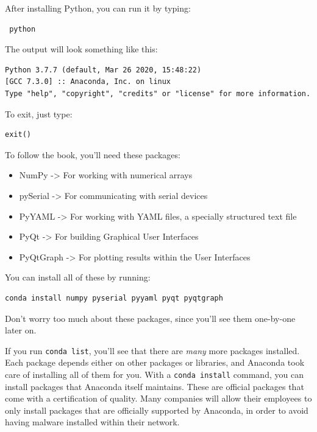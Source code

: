 
After installing Python, you can run it by typing:

\begin{verbatim}
 python
\end{verbatim}

The output will look something like this:

\begin{verbatim}
Python 3.7.7 (default, Mar 26 2020, 15:48:22)
[GCC 7.3.0] :: Anaconda, Inc. on linux
Type "help", "copyright", "credits" or "license" for more information.
\end{verbatim}

To exit, just type:

\begin{verbatim}
exit()
\end{verbatim}

To follow the book, you'll need these packages:

\begin{itemize}
 \item NumPy -> For working with numerical arrays
 \item pySerial -> For communicating with serial devices
 \item PyYAML -> For working with YAML files, a specially structured text file
 \item PyQt -> For building Graphical User Interfaces
 \item PyQtGraph -> For plotting results within the User Interfaces
\end{itemize}

You can install all of these by running:

\begin{verbatim}
conda install numpy pyserial pyyaml pyqt pyqtgraph
\end{verbatim}

Don't worry too much about these packages, since you'll see them one-by-one later on.

If you run \texttt{conda list}, you'll see that there are \emph{many} more packages installed. Each package depends either on other packages or libraries, and Anaconda took care of installing all of them for you. With a \texttt{conda install} command, you can install packages that Anaconda itself maintains. These are official packages that come with a certification of quality. Many companies will allow their employees to only install packages that are officially supported by Anaconda, in order to avoid having malware installed within their network.

